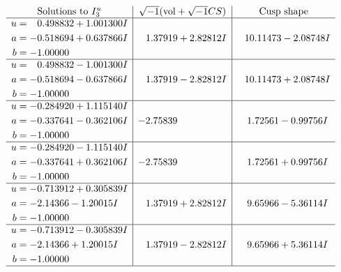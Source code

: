 \documentclass[1p]{elsarticle_modified}
\theoremstyle{definition}
\newcommand{\I}{\sqrt{-1}}
\begin{document}
$$\begin{array}{c|c|c}  
\text{Solutions to }I^u_{3}& \I (\text{vol} + \sqrt{-1}CS) & \text{Cusp shape}\\
 \hline 
\begin{aligned}
u &= \phantom{-}0.498832 + 1.001300 I \\
a &= -0.518694 + 0.637866 I \\
b &= -1.00000\phantom{ +0.000000I}\end{aligned}
 & \phantom{-}1.37919 + 2.82812 I & \phantom{-}10.11473 - 2.08748 I \\ \hline\begin{aligned}
u &= \phantom{-}0.498832 - 1.001300 I \\
a &= -0.518694 - 0.637866 I \\
b &= -1.00000\phantom{ +0.000000I}\end{aligned}
 & \phantom{-}1.37919 - 2.82812 I & \phantom{-}10.11473 + 2.08748 I \\ \hline\begin{aligned}
u &= -0.284920 + 1.115140 I \\
a &= -0.337641 - 0.362106 I \\
b &= -1.00000\phantom{ +0.000000I}\end{aligned}
 & -2.75839\phantom{ +0.000000I} & \phantom{-}1.72561 - 0.99756 I \\ \hline\begin{aligned}
u &= -0.284920 - 1.115140 I \\
a &= -0.337641 + 0.362106 I \\
b &= -1.00000\phantom{ +0.000000I}\end{aligned}
 & -2.75839\phantom{ +0.000000I} & \phantom{-}1.72561 + 0.99756 I \\ \hline\begin{aligned}
u &= -0.713912 + 0.305839 I \\
a &= -2.14366 - 1.20015 I \\
b &= -1.00000\phantom{ +0.000000I}\end{aligned}
 & \phantom{-}1.37919 + 2.82812 I & \phantom{-}9.65966 - 5.36114 I \\ \hline\begin{aligned}
u &= -0.713912 - 0.305839 I \\
a &= -2.14366 + 1.20015 I \\
b &= -1.00000\phantom{ +0.000000I}\end{aligned}
 & \phantom{-}1.37919 - 2.82812 I & \phantom{-}9.65966 + 5.36114 I\\
 \hline 
 \end{array}$$\newpage\newpage\renewcommand{\arraystretch}{1}
\end{document}
